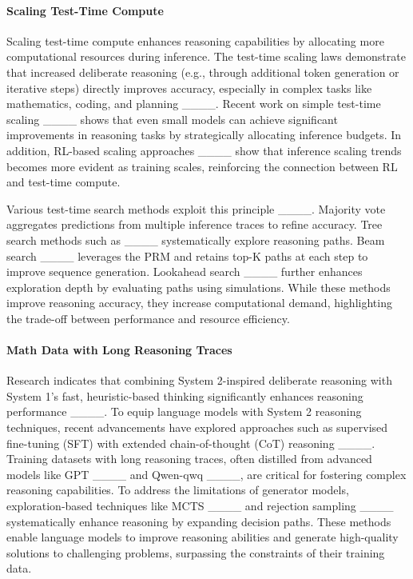 \paragraph{Scaling Test-Time Compute}
Scaling test-time compute enhances reasoning capabilities by allocating more computational resources during inference. The test-time scaling laws demonstrate that increased deliberate reasoning (e.g., through additional token generation or iterative steps) directly improves accuracy, especially in complex tasks like mathematics, coding, and planning ____.
Recent work on simple test-time scaling ____ shows that even small models can achieve significant improvements in reasoning tasks by strategically allocating inference budgets. In addition, RL-based scaling approaches ____ show that inference scaling trends becomes more evident as training scales, reinforcing the connection between RL and test-time compute.

Various test-time search methods exploit this principle ____. Majority vote aggregates predictions from multiple inference traces to refine accuracy. Tree search methods such as ____ systematically explore reasoning paths. Beam search ____ leverages the PRM and retains top-K paths at each step to improve sequence generation. Lookahead search ____ further enhances exploration depth by evaluating paths using simulations. While these methods improve reasoning accuracy, they increase computational demand, highlighting the trade-off between performance and resource efficiency.


\paragraph{Math Data with Long Reasoning Traces}

Research indicates that combining System 2-inspired deliberate reasoning with System 1’s fast, heuristic-based thinking significantly enhances reasoning performance ____. 
To equip language models with System 2 reasoning techniques, recent advancements have explored approaches such as supervised fine-tuning (SFT) with extended chain-of-thought (CoT) reasoning ____. 
Training datasets with long reasoning traces, often distilled from advanced models like GPT ____ and Qwen-qwq ____, are critical for fostering complex reasoning capabilities. 
To address the limitations of generator models, exploration-based techniques like MCTS ____ and rejection sampling ____ systematically enhance reasoning by expanding decision paths. 
These methods enable language models to improve reasoning abilities and generate high-quality solutions to challenging problems, surpassing the constraints of their training data.

